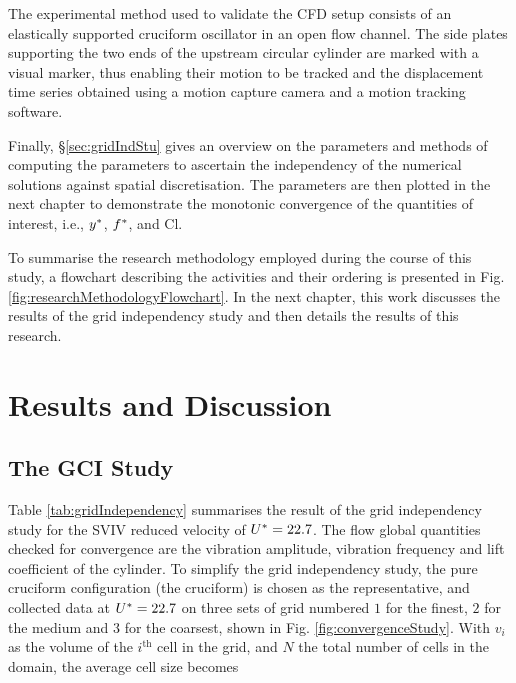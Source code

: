 \documentclass[oneside]{utmthesis}
\begin{document}
The experimental method used to validate the CFD setup consists of an elastically supported cruciform oscillator in an open flow channel. The side plates supporting the two ends of the upstream circular cylinder are marked with a visual marker, thus enabling their motion to be tracked and the displacement time series obtained using a motion capture camera and a motion tracking software.

Finally, \S\ref{sec:gridIndStu} gives an overview on the parameters and methods of computing the parameters to ascertain the independency of the numerical solutions against spatial discretisation. The parameters are then plotted in the next chapter to demonstrate the monotonic convergence of the quantities of interest, i.e., $y^{*}$, $f^{*}$, and Cl.

To summarise the research methodology employed during the course of this study, a flowchart describing the activities and their ordering is presented in Fig. \ref{fig:researchMethodologyFlowchart}. In the next chapter, this work discusses the results of the grid independency study and then details the results of this research.

\chapter{Results and Discussion} \label{chap:resultsDisc}
\section{The GCI Study} \label{sec:gciStudyResult}
Table \ref{tab:gridIndependency} summarises the result of the grid independency study for the SVIV reduced velocity of $U^{*} = 22.7$. The flow global quantities checked for convergence are the vibration amplitude, vibration frequency and lift coefficient of the cylinder. To simplify the grid independency study, the pure cruciform configuration (the \angfi{} cruciform) is chosen as the representative, and collected data at $U^{*} = 22.7$ on three sets of grid numbered $1$ for the finest, $2$ for the medium and $3$ for the coarsest, shown in Fig. \ref{fig:convergenceStudy}. With $v_{i}$ as the volume of the $i^{\text{th}}$ cell in the grid, and $N$ the total number of cells in the domain, the average cell size becomes
\end{document}
